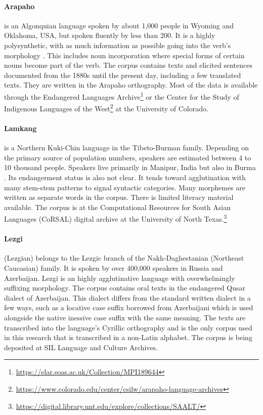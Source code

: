 \paragraph{Arapaho}
is an Algonquian language spoken by about 1,000 people in Wyoming and Oklahoma, USA, but spoken fluently by less than 200. It is a highly polysynthetic, with as much information as possible going into the verb's morphology \citep{cowell_arapaho_2008}. This includes noun incorporation where special forms of certain nouns become part of the verb. The corpus contains texts and elicited sentences documented from the 1880s until the present day, including a few translated texts. They are written in the Arapaho orthography. Most of the data is available through the Endangered Languages Archive\footnote{\url{https://elar.soas.ac.uk/Collection/MPI189644}} or the Center for the Study of Indigenous Languages of the West\footnote{\url{https://www.colorado.edu/center/csilw/arapaho-language-archives}} at the University of Colorado.

\paragraph{Lamkang} 
is a Northern Kuki-Chin language in the Tibeto-Burman family. Depending on the primary source of population numbers, speakers are estimated between 4 to 10 thousand people. Speakers live primarily in Manipur, India but also in Burma \cite{lamkang_2007}. Its endangerment status is also not clear. It tends toward agglutination with many stem-stem patterns to signal syntactic categories. Many morphemes are written as separate words in the corpus. There is limited literacy material available. The corpus is at the Computational Resources for South Asian Languages (CoRSAL) digital archive at the University of North Texas.\footnote{\url{https://digital.library.unt.edu/explore/collections/SAALT/}}

\paragraph{Lezgi} 
(Lezgian) belongs to the Lezgic branch of the Nakh-Daghestanian (Northeast Caucasian) family. It is spoken by over 400,000 speakers in Russia and Azerbaijan. Lezgi is an highly agglutinative language with overwhelmingly suffixing morphology. The corpus contains oral texts in the endangered Qusar dialect of Azerbaijan. This dialect differs from the standard written dialect in a few ways, such as a locative case suffix borrowed from Azerbaijani which is used alongside the native inessive case suffix with the same meaning. The texts are transcribed into the language's Cyrillic orthography and is the only corpus used in this research that is transcribed in a non-Latin alphabet. The corpus is being deposited at SIL Language and Culture Archives.

